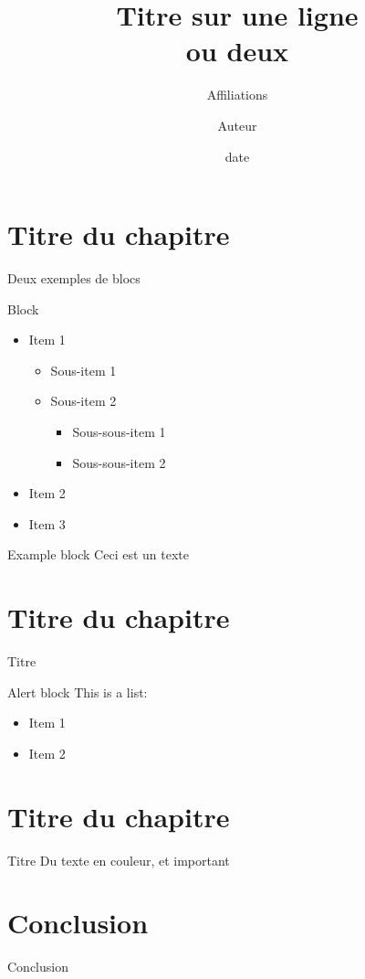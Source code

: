 \documentclass[slideopt,A4,showboxes,svgnames]{beamer}
\title[titrecourt]{Titre sur une ligne\\ ou deux}
\date[date]{date}
\author[Auteur]{Auteur}
\subtitle{Affiliations}
\begin{document}
\begin{frame}
    \titlepage
\end{frame}


\frame{\tocpage}
 
\section{Titre du chapitre}
\frame{\sectionpage}

\begin{frame}{Deux exemples de blocs}
\begin{block}{Block}
\begin{itemize}
\item{Item 1 }
\begin{itemize}
\item {Sous-item 1}
\item {Sous-item 2}
\begin{itemize}
\item {Sous-sous-item 1}
\item {Sous-sous-item 2}
\end{itemize}
\end{itemize}
\item {Item 2}
\item {Item 3}
\end{itemize}
\end{block}
\begin{exampleblock}{Example block}
Ceci est un texte
\end{exampleblock}
\end{frame}


\section{Titre du chapitre}
 \frame{\sectionpage}

\begin{frame}{Titre}
\begin{alertblock}{Alert block}
	This is a list:
	\begin{itemize}
	\item[\green \checkmark]{Item 1}
	\item[\red \xmark]{Item 2}
	\end{itemize}
\end{alertblock}
\end{frame}

\section{Titre du chapitre}
 \frame{\sectionpage}

\begin{frame}{Titre}
Du \textcolor{gris_fonce_inria}{texte}  {en}  \textcolor{rouge_inria}{couleur}, et \alert{important}
\end{frame}
\section{Conclusion}
\begin{frame}{Conclusion}
 
\end{frame}
\end{document}
